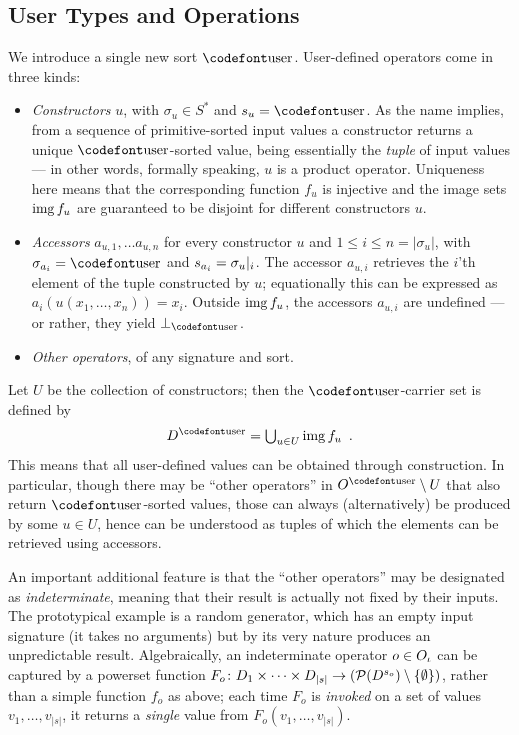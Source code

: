 \subsection{User Types and Operations}
\label{sec:user}

We introduce a single new sort $\userS$. User-defined operators come in three kinds:
%
\begin{itemize}
\item \emph{Constructors} $u$, with $\sigma_u\in S^*$ and $s_u=\userS$. As the name implies, from a sequence of primitive-sorted input values a constructor returns a unique $\userS$-sorted value, being essentially the \emph{tuple} of input values --- in other words, formally speaking, $u$ is a product operator. Uniqueness here means that the corresponding function $f_u$ is injective and the image sets $\mathop{\mathrm{img}} f_u$ are guaranteed to be disjoint for different constructors $u$.

\item \emph{Accessors} $a_{u,1},\ldots a_{u,n}$ for every constructor $u$ and $1\leq i\leq n=|\sigma_u|$, with $\sigma_{a_i}=\userS$ and $s_{a_i}=\sigma_u{|_{i}}$. The accessor $a_{u,i}$ retrieves the $i$'th element of the tuple constructed by $u$; equationally this can be expressed as $a_i(u(x_1,\ldots,x_n))=x_i$. Outside $\mathop{\mathrm{img}} f_u$, the accessors $a_{u,i}$ are undefined --- or rather, they yield $\bot_\userS$.

\item \emph{Other operators}, of any signature and sort.
\end{itemize}
%
Let $U$ be the collection of constructors; then the $\userS$-carrier set is defined by
%
\[ D^\userS = \textstyle\bigcup_{u\in U} \img f_u \enspace. \]
%
This means that all user-defined values can be obtained through construction. In particular, though there may be ``other operators'' in $O^\userS\setminus U$ that also return $\userS$-sorted values, those can always (alternatively) be produced by some $u\in U$, hence can be understood as tuples of which the elements can be retrieved using accessors.

\medskip\noindent An important additional feature is that the ``other operators'' may be designated as \emph{indeterminate}, meaning that their result is actually not fixed by their inputs. The prototypical example is a random generator, which has an empty input signature (it takes no arguments) but by its very nature produces an unpredictable result. Algebraically, an indeterminate operator $o\in {O}_\iota$ can be captured by a powerset function $F_o\colon D_1\times\cdots \times D_{|s|} \to (\mathcal{P}(D^{s_o})\setminus \{{\emptyset}\})$, rather than a simple function $f_o$ as above; each time $F_o$ is \emph{invoked} on a set of values $v_1,\ldots, v_{|s|}$, it returns a \emph{single} value from $F_o(v_1,\ldots,v_{|s|})$.

